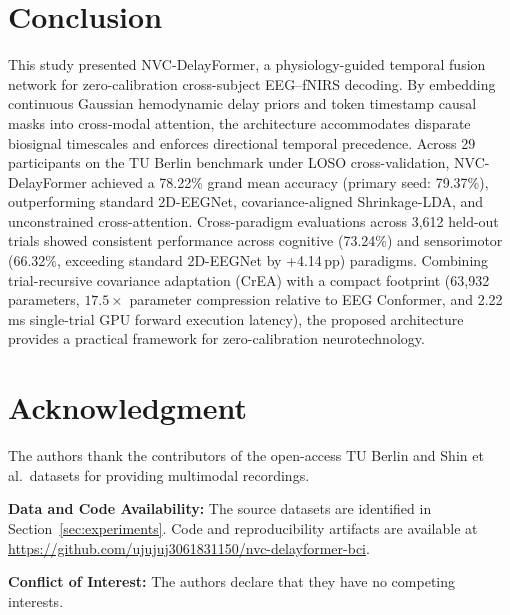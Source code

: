 \documentclass[journal]{IEEEtran}
\begin{document}
\section{Conclusion}
\label{sec:conclusion}
This study presented NVC-DelayFormer, a physiology-guided temporal fusion network for zero-calibration cross-subject EEG--fNIRS decoding. By embedding continuous Gaussian hemodynamic delay priors and token timestamp causal masks into cross-modal attention, the architecture accommodates disparate biosignal timescales and enforces directional temporal precedence. Across 29 participants on the TU Berlin benchmark under LOSO cross-validation, NVC-DelayFormer achieved a 78.22\% grand mean accuracy (primary seed: 79.37\%), outperforming standard 2D-EEGNet, covariance-aligned Shrinkage-LDA, and unconstrained cross-attention. Cross-paradigm evaluations across 3,612 held-out trials showed consistent performance across cognitive (73.24\%) and sensorimotor (66.32\%, exceeding standard 2D-EEGNet by +4.14\,pp) paradigms. Combining trial-recursive covariance adaptation (CrEA) with a compact footprint (63,932 parameters, $17.5\times$ parameter compression relative to EEG Conformer, and 2.22\,ms single-trial GPU forward execution latency), the proposed architecture provides a practical framework for zero-calibration neurotechnology.
\section*{Acknowledgment}
The authors thank the contributors of the open-access TU Berlin and Shin et al.\ datasets for providing multimodal recordings.
\par\textbf{Data and Code Availability:} The source datasets are identified in Section~\ref{sec:experiments}. Code and reproducibility artifacts are available at \url{https://github.com/ujujuj3061831150/nvc-delayformer-bci}.
\par\textbf{Conflict of Interest:} The authors declare that they have no competing interests.


\end{document}
